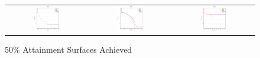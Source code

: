 \begin{figure}[t]
\centering
\caption{50\% Attainment Surfaces Achieved}
\label{fig:Attainment_Surfaces}
\begin{tabular}{ccc}
   \includegraphics[width=0.33\textwidth]{Surfaces/WFG2.eps} &
    \includegraphics[width=0.33\textwidth]{Surfaces/WFG8.eps} &
     \includegraphics[width=0.33\textwidth]{Surfaces/DTLZ7.eps}
\end{tabular}
\end{figure}
%
